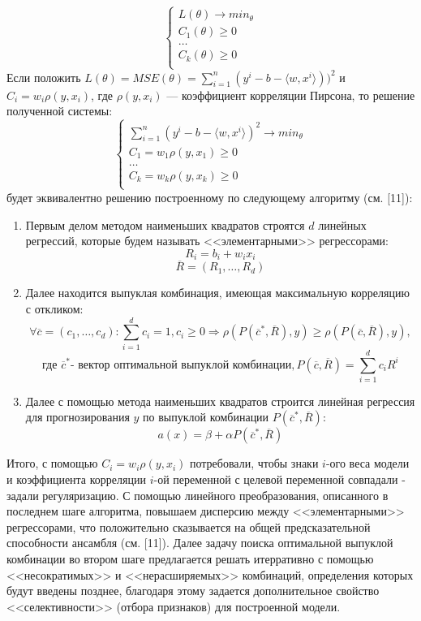 \documentclass{article}
\begin{document}
\begin{equation}
\begin{cases}
    L(\theta) \rightarrow min_\theta \\
    C_1(\theta) \geq 0\\
    \dots \\
    C_k(\theta) \geq 0 \\
\end{cases}
\end{equation}
Если положить $L(\theta) = MSE(\theta) = \sum_{i=1}^n (y^i - b - \langle w, x^i\rangle))^2$ и $C_i = w_i \rho(y, x_i)$, где $\rho(y, x_i)$ — коэффициент корреляции Пирсона, то решение полученной системы:
\begin{equation}
\begin{cases}
    \sum_{i=1}^n (y^i - b - \langle w, x^i\rangle)^2 \rightarrow min_\theta\\
    C_1 = w_1 \rho(y, x_1) \geq 0\\
    \dots \\
    C_k = w_k \rho(y, x_k) \geq 0 \\
\end{cases}
\end{equation}
будет эквивалентно решению построенному по следующему алгоритму (см. [11]):
\begin{enumerate}
    \item Первым делом методом наименьших квадратов строятся $d$ линейных регрессий, которые будем называть <<элементарными>> регрессорами:
    $$
    R_i = b_i + w_ix_i 
    $$
    $$
    \overline{R} = (R_1, \dots, R_d)
    $$
    \item Далее находится выпуклая комбинация, имеющая максимальную корреляцию с откликом:
    $$
    \forall \overline{c} = (c_1, \dots, c_d) : \sum_{i=1}^d c_i = 1, c_i \geq 0 \Rightarrow \rho(P(\overline{c}^*, \overline{R}), y) \geq \rho(P(\overline{c}, \overline{R}), y),
    $$
    $$
    \text{где } \overline{c}^* \text{- вектор оптимальной выпуклой комбинации}, P(\overline{c},\overline{R}) = \sum_{i=1}^d c_iR^i
    $$
    \item Далее с помощью метода наименьших квадратов строится линейная регрессия для прогнозирования $y$ по выпуклой комбинации $P(\overline{c}^*, \overline{R})$:
    $$
    a(x) = \beta + \alpha P(\overline{c}^*, \overline{R})
    $$
\end{enumerate}
Итого, с помощью $C_i = w_i \rho(y, x_i)$ потребовали, чтобы знаки $i$-ого веса модели и коэффициента корреляции $i$-ой переменной с целевой переменной совпадали - задали регуляризацию. С помощью линейного преобразования, описанного в последнем шаге алгоритма, повышаем дисперсию между <<элементарными>> регрессорами, что положительно сказывается на общей предсказательной способности ансамбля (см. [11]). Далее задачу поиска оптимальной выпуклой комбинации во втором шаге предлагается решать итерративно с помощью <<несократимых>> и <<нерасширяемых>> комбинаций, определения которых будут введены позднее,  благодаря этому задается дополнительное свойство <<селективности>> (отбора признаков) для построенной модели.
\newpage
\end{document}
